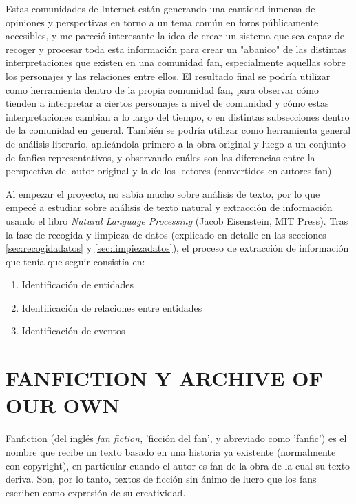 \documentclass{pre-tfg}
\begin{document}
Estas comunidades de Internet están generando una cantidad inmensa de opiniones y perspectivas en torno a un tema común en foros públicamente accesibles, y me pareció interesante la idea de crear un sistema que sea capaz de recoger y procesar toda esta información para crear un "abanico" de las distintas interpretaciones que existen en una comunidad fan, especialmente aquellas sobre los personajes y las relaciones entre ellos. El resultado final se podría utilizar como herramienta dentro de la propia comunidad fan, para observar cómo tienden a interpretar a ciertos personajes a nivel de comunidad y cómo estas interpretaciones cambian a lo largo del tiempo, o en distintas subsecciones dentro de la comunidad en general. También se podría utilizar como herramienta general de análisis literario, aplicándola primero a la obra original y luego a un conjunto de fanfics representativos, y observando cuáles son las diferencias entre la perspectiva del autor original y la de los lectores (convertidos en autores fan).

Al empezar el proyecto, no sabía mucho sobre análisis de texto, por lo que empecé a estudiar sobre análisis de texto natural y extracción de información usando el libro \textit{Natural Language Processing} (Jacob Eisenstein, MIT Press). Tras la fase de recogida y limpieza de datos (explicado en detalle en las secciones \ref{sec:recogidadatos} y \ref{sec:limpiezadatos}), el proceso de extracción de información que tenía que seguir consistía en:


\begin{enumerate}
	\item Identificación de entidades
	\item Identificación de relaciones entre entidades
	\item Identificación de eventos
\end{enumerate}



\section{FANFICTION Y ARCHIVE OF OUR OWN}

Fanfiction (del inglés \textit{fan fiction}, 'ficción del fan', y abreviado como 'fanfic') es el nombre que recibe un texto basado en una historia ya existente (normalmente con copyright), en particular cuando el autor es fan de la obra de la cual su texto deriva. Son, por lo tanto, textos de ficción sin ánimo de lucro que los fans escriben como expresión de su creatividad.
\end{document}
